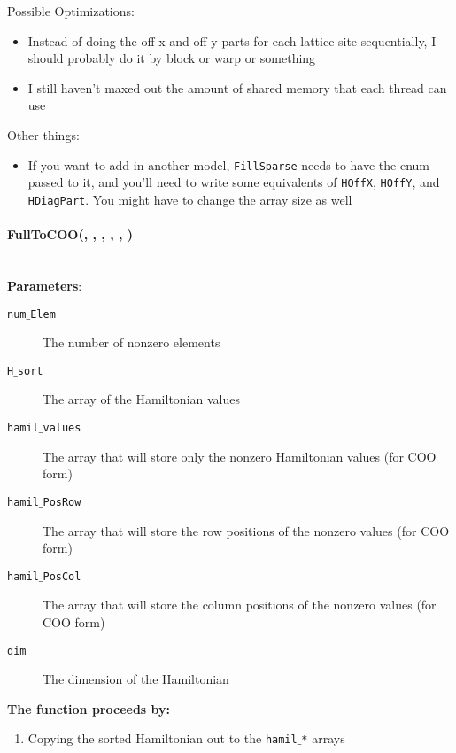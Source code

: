 \documentclass{article}
\begin{document}
Possible Optimizations:
\begin{itemize}
\item{Instead of doing the off-x and off-y parts for each lattice site sequentially, I should probably do it by block or warp or something}
\item{I still haven't maxed out the amount of shared memory that each thread can use}
\end{itemize}

Other things:
\begin{itemize}
\item{If you want to add in another model, \texttt{FillSparse} needs to have the enum passed to it, and you'll need to write some equivalents of \texttt{HOffX}, \texttt{HOffY}, and \texttt{HDiagPart}. You might have to change the array size as well}
\end{itemize}

\paragraph{\cudaglobal \void FullToCOO(\int , \hamstruct, \cuDoubleComplex , \ptrint , \ptrint, \int) \\ \\}
\noindent\textbf{Parameters}:
\begin{description}
\item[\int \texttt{num$\_$Elem}] The number of nonzero elements
\item[\hamstruct \texttt{H$\_$sort}] The array of the Hamiltonian values
\item[\cuDoubleComplex \texttt{hamil$\_$values}] The array that will store only the nonzero Hamiltonian values (for COO form)
\item[\ptrint \texttt{hamil$\_$PosRow}] The array that will store the row positions of the nonzero values (for COO form)
\item[\ptrint \texttt{hamil$\_$PosCol}] The array that will store the column positions of the nonzero values (for COO form)
\item[\int \texttt{dim}] The dimension of the Hamiltonian

\end{description}

\noindent\textbf{The function proceeds by:}
\begin{enumerate}
\item{Copying the sorted Hamiltonian out to the \texttt{hamil$\_$*} arrays}
\end{enumerate}
\end{document}
